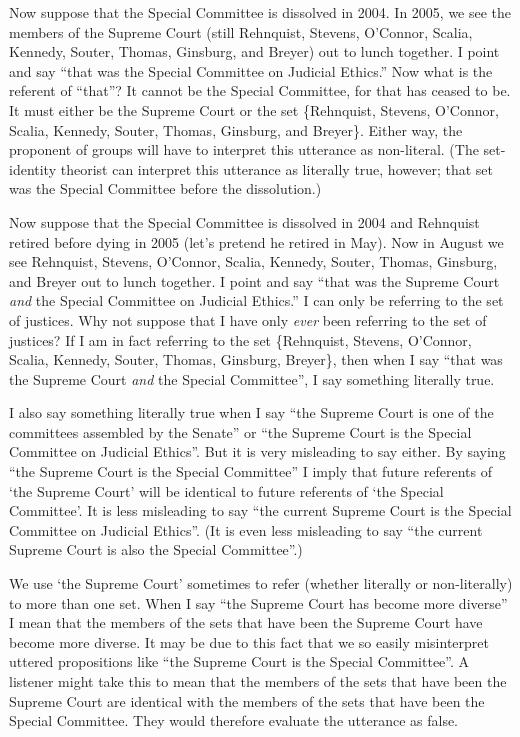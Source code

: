 \documentclass[11pt]{article}
\begin{document}
\begin{spacing}{1.5}
Now suppose that the Special Committee is dissolved in 2004.  In 2005,
we see the members of the Supreme Court (still Rehnquist, Stevens,
O'Connor, Scalia, Kennedy, Souter, Thomas, Ginsburg, and Breyer) out
to lunch together.  I point and say ``that was the Special Committee
on Judicial Ethics.''  Now what is the referent of ``that''?  It
cannot be the Special Committee, for that has ceased to be.  It must
either be the Supreme Court or the set \{Rehnquist, Stevens, O'Connor,
Scalia, Kennedy, Souter, Thomas, Ginsburg, and Breyer\}.  Either way,
the proponent of groups will have to interpret this utterance as
non-literal.  (The set-identity theorist can interpret this utterance
as literally true, however; that set was the Special Committee before
the dissolution.)

Now suppose that the Special Committee is dissolved in 2004 and
Rehnquist retired before dying in 2005 (let's pretend he retired in
May).  Now in August we see Rehnquist, Stevens, O'Connor, Scalia,
Kennedy, Souter, Thomas, Ginsburg, and Breyer out to lunch together.
I point and say ``that was the Supreme Court {\em and} the Special
Committee on Judicial Ethics.''  I can only be referring to the set of
justices.  Why not suppose that I have only {\em ever} been referring
to the set of justices?  If I am in fact referring to the set
\{Rehnquist, Stevens, O'Connor, Scalia, Kennedy, Souter, Thomas,
Ginsburg, Breyer\}, then when I say ``that was the Supreme Court {\em
  and} the Special Committee'', I say something literally true.

I also say something literally true when I say ``the Supreme Court is
one of the committees assembled by the Senate'' or ``the Supreme Court
is the Special Committee on Judicial Ethics''.  But it is very
misleading to say either.  By saying ``the Supreme Court is the
Special Committee'' I imply that future referents of `the Supreme
Court' will be identical to future referents of `the Special
Committee'.  It is less misleading to say ``the current Supreme Court
is the Special Committee on Judicial Ethics''.  (It is even less
misleading to say ``the current Supreme Court is also the Special
Committee''.)

We use `the Supreme Court' sometimes to refer (whether literally or
non-literally) to more than one set.  When I say ``the Supreme Court
has become more diverse'' I mean that the members of the sets that
have been the Supreme Court have become more diverse.  It may be due
to this fact that we so easily misinterpret uttered propositions like
``the Supreme Court is the Special Committee''.  A listener might take
this to mean that the members of the sets that have been the Supreme
Court are identical with the members of the sets that have been the
Special Committee.  They would therefore evaluate the utterance as
false.


\end{spacing}
\end{document}
